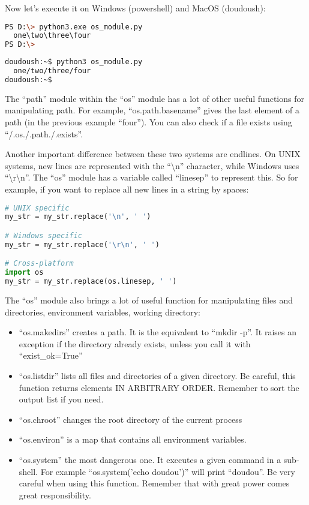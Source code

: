 Now let's execute it on Windows (powershell) and MacOS (doudoush):

\begin{lstlisting}[language=bash]
PS D:\> python3.exe os_module.py
  one\two\three\four
PS D:\>
\end{lstlisting}

\begin{lstlisting}[language=bash]
doudoush:~$ python3 os_module.py
  one/two/three/four
doudoush:~$
\end{lstlisting}

The ``path'' module within the ``os'' module has a lot of other useful functions for
manipulating path. For example, ``os.path.basename'' gives the last element of a path
(in the previous example ``four''). You can also check if a file exists using ``/.os./.path./.exists''.


\vspace{5mm}

Another important difference between these two systems are endlines. On UNIX systems,
new lines are represented with the ``\textbackslash n'' character, while
Windows uses ``\textbackslash r\textbackslash n''.
The ``os'' module has a variable called ``linesep'' to represent this. So for example,
if you want to replace all new lines in a string by spaces:

\begin{lstlisting}[language=python]
# UNIX specific
my_str = my_str.replace('\n', ' ')

# Windows specific
my_str = my_str.replace('\r\n', ' ')

# Cross-platform
import os
my_str = my_str.replace(os.linesep, ' ')
\end{lstlisting}

\vspace{5mm}

The ``os'' module also brings a lot of useful function for manipulating files
and directories, environment variables, working directory:

\begin{itemize}
\item ``os.makedirs'' creates a path. It is the equivalent to ``mkdir -p''.
  It raises an exception if the directory already exists, unless you call it
  with ``exist\_ok=True''
\item ``os.listdir'' lists all files and directories of a given directory.
  Be careful, this function returns elements IN ARBITRARY ORDER. Remember
  to sort the output list if you need.
\item ``os.chroot'' changes the root directory of the current process
\item ``os.environ'' is a map that contains all environment variables.
\item ``os.system'' the most dangerous one. It executes a given command in a sub-shell.
  For example ``os.system('echo doudou')'' will print ``doudou''. Be very careful
  when using this function. Remember that with great power comes great responsibility.
\end{itemize}


